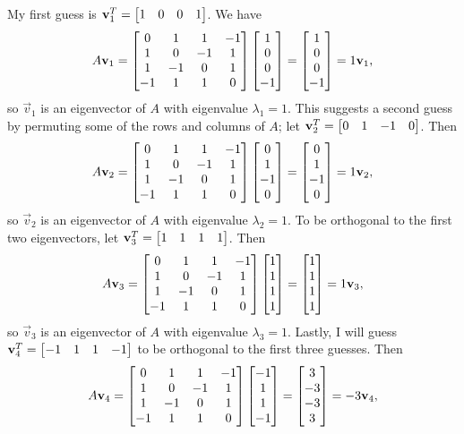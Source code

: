 \documentclass{homework}
\begin{document}
	My first guess is $\mathbf{v}_1^T = \left[\begin{matrix}1 & 0 & 0 & 1\end{matrix}\right]$. We have
	\begin{equation*}
		A\mathbf{v}_1 = \left[\begin{matrix}0 & 1 & 1 & -1 \\ 1 & 0 & -1 & 1 \\ 1 & -1 & 0 & 1 \\ -1 & 1 & 1 & 0\end{matrix}\right]\left[\begin{matrix}1\\0\\0\\-1\end{matrix}\right] = \left[\begin{matrix}1 \\ 0 \\ 0 \\ -1\end{matrix}\right] = 1\mathbf{v}_1,
	\end{equation*}
	so $\vec{v}_1$ is an eigenvector of $A$ with eigenvalue $\lambda_1 = 1$. This suggests a second guess by permuting some of the rows and columns of $A$; let $\mathbf{v}_2^T = \left[\begin{matrix}0 & 1 & -1 & 0\end{matrix}\right]$. Then
	\begin{equation*}
		A\mathbf{v}_2 = \left[\begin{matrix}0 & 1 & 1 & -1 \\ 1 & 0 & -1 & 1 \\ 1 & -1 & 0 & 1 \\ -1 & 1 & 1 & 0\end{matrix}\right]\left[\begin{matrix}0\\1\\-1\\0\end{matrix}\right] = \left[\begin{matrix}0\\1\\-1\\0\end{matrix}\right] = 1\mathbf{v}_2,
	\end{equation*}
	so $\vec{v}_2$ is an eigenvector of $A$ with eigenvalue $\lambda_2 = 1$. To be orthogonal to the first two eigenvectors, let $\mathbf{v}_3^T = \left[\begin{matrix}1 & 1 & 1 & 1\end{matrix}\right]$. Then
	\begin{equation*}
		A\mathbf{v}_3 = \left[\begin{matrix}0 & 1 & 1 & -1 \\ 1 & 0 & -1 & 1 \\ 1 & -1 & 0 & 1 \\ -1 & 1 & 1 & 0\end{matrix}\right]\left[\begin{matrix}1\\1\\1\\1\end{matrix}\right] = \left[\begin{matrix}1\\1\\1\\1\end{matrix}\right] = 1\mathbf{v}_3,
	\end{equation*}
	so $\vec{v}_3$ is an eigenvector of $A$ with eigenvalue $\lambda_3 = 1$. Lastly, I will guess $\mathbf{v}_4^T = \left[\begin{matrix}-1&1&1&-1\end{matrix}\right]$ to be orthogonal to the first three guesses. Then
	\begin{equation*}
		A\mathbf{v}_4 = \left[\begin{matrix}0 & 1 & 1 & -1 \\ 1 & 0 & -1 & 1 \\ 1 & -1 & 0 & 1 \\ -1 & 1 & 1 & 0\end{matrix}\right]\left[\begin{matrix}-1\\1\\1\\-1\end{matrix}\right] = \left[\begin{matrix}3\\-3\\-3\\3\end{matrix}\right] = -3\mathbf{v}_4,
	\end{equation*}
\end{document}
